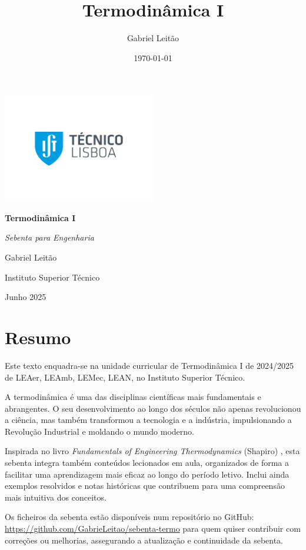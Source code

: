 \documentclass[a4paper,12pt, openany]{book}
\title{Termodinâmica I}
\author{Gabriel Leitão}
\date{\today}
\theoremstyle{mystyle}
\begin{document}
\frontmatter
\begin{titlepage}
    \centering
    \includegraphics[width=0.5\textwidth]{images/ist.jpg} %
    \vspace{2cm}

    {\Huge \bfseries Termodinâmica I\par}
    \vspace{1.5cm}
    {\Large \textit{Sebenta para Engenharia}\par}
    \vfill

    {\Large Gabriel Leitão\par}
    \vspace{0.5cm}
    {\large Instituto Superior Técnico\par}
    \vspace{0.5cm}
    {\large Junho 2025\par}
\end{titlepage}


\chapter*{Resumo}
Este texto enquadra-se na unidade curricular de Termodinâmica I de 2024/2025 de LEAer, LEAmb, LEMec, LEAN, no Instituto Superior Técnico. 

A termodinâmica é uma das disciplinas científicas mais fundamentais e abrangentes. O seu desenvolvimento ao longo dos séculos não apenas revolucionou a ciência, mas também transformou a tecnologia e a indústria, impulsionando a Revolução Industrial e moldando o mundo moderno.

Inspirada no livro \emph{Fundamentals of Engineering Thermodynamics} (Shapiro) \cite{shapiro}, esta sebenta integra também conteúdos lecionados em aula, organizados de forma a facilitar uma aprendizagem mais eficaz ao longo do período letivo. Inclui ainda exemplos resolvidos e notas históricas que contribuem para uma compreensão mais intuitiva dos conceitos.

Os ficheiros da sebenta estão disponíveis num repositório no GitHub: \url{https://github.com/GabrieLeitao/sebenta-termo} para quem quiser contribuir com correções ou melhorias, assegurando a atualização e continuidade da sebenta.
\end{document}
